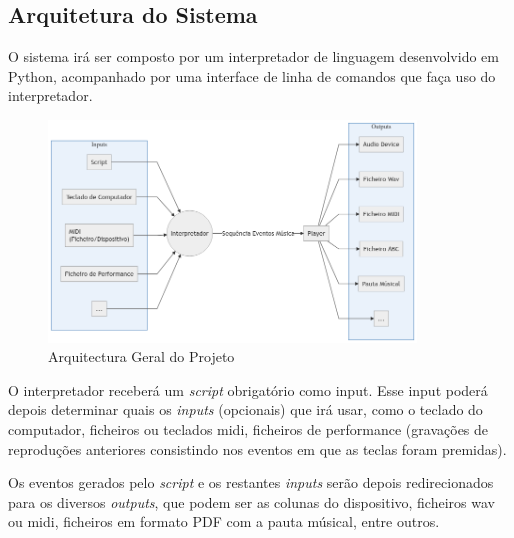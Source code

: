\subsection{Arquitetura do Sistema}
O sistema irá ser composto por um interpretador de linguagem desenvolvido em Python, acompanhado por uma interface de linha de comandos que faça uso do interpretador.
\begin{figure}[h]
\begin{center}
    \includegraphics[width=0.87\textwidth]{img/diagram_architecture.png}
\end{center}
\caption{Arquitectura Geral do Projeto}
\end{figure}

O interpretador receberá um \textit{script} obrigatório como input. Esse input poderá depois determinar quais os \textit{inputs} (opcionais) que irá usar, como o teclado do computador, ficheiros ou teclados \acrshort{midi}, ficheiros de performance (gravações de reproduções anteriores consistindo nos eventos em que as teclas foram premidas).

Os eventos gerados pelo \textit{script} e os restantes \textit{inputs} serão depois redirecionados para os diversos \textit{outputs}, que podem ser as colunas do dispositivo, ficheiros \acrshort{wav} ou \acrshort{midi}, ficheiros em formato PDF com a pauta músical, entre outros.

